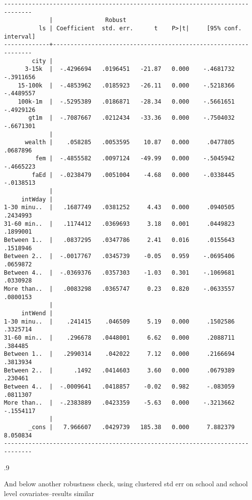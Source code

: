 \documentclass[11pt, letterpaper]{article}
\begin{document}
\begin{spacing}{1.9}
\begin{spacing}{.5}
\begin{scriptsize}
\begin{verbatim}
------------------------------------------------------------------------------
             |               Robust
          ls | Coefficient  std. err.      t    P>|t|     [95% conf. interval]
-------------+----------------------------------------------------------------
        city |
      3-15k  |  -.4296694   .0196451   -21.87   0.000    -.4681732   -.3911656
    15-100k  |  -.4853962   .0185923   -26.11   0.000    -.5218366   -.4489557
    100k-1m  |  -.5295389   .0186871   -28.34   0.000    -.5661651   -.4929126
       gt1m  |  -.7087667   .0212434   -33.36   0.000    -.7504032   -.6671301
             |
      wealth |    .058285   .0053595    10.87   0.000     .0477805    .0687896
         fem |  -.4855582   .0097124   -49.99   0.000    -.5045942   -.4665223
        faEd |  -.0238479   .0051004    -4.68   0.000    -.0338445   -.0138513
             |
     intWday |
1-30 minu..  |   .1687749   .0381252     4.43   0.000     .0940505    .2434993
31-60 min..  |   .1174412   .0369693     3.18   0.001     .0449823    .1899001
Between 1..  |   .0837295   .0347786     2.41   0.016     .0155643    .1518946
Between 2..  |  -.0017767   .0345739    -0.05   0.959    -.0695406    .0659872
Between 4..  |  -.0369376   .0357303    -1.03   0.301    -.1069681    .0330928
More than..  |   .0083298   .0365747     0.23   0.820    -.0633557    .0800153
             |
     intWend |
1-30 minu..  |    .241415    .046509     5.19   0.000     .1502586    .3325714
31-60 min..  |    .296678   .0448001     6.62   0.000     .2088711     .384485
Between 1..  |   .2990314    .042022     7.12   0.000     .2166694    .3813934
Between 2..  |      .1492   .0414603     3.60   0.000     .0679389     .230461
Between 4..  |  -.0009641   .0418857    -0.02   0.982     -.083059    .0811307
More than..  |  -.2383889   .0423359    -5.63   0.000    -.3213662   -.1554117
             |
       _cons |   7.966607   .0429739   185.38   0.000     7.882379    8.050834
------------------------------------------------------------------------------
\end{verbatim}
\end{scriptsize}
\end{spacing}{.9}



And below another robustness check, using clustered std err on school and school
level covariates--results similar
\begin{spacing}{.5}
\begin{scriptsize}
\begin{verbatim}


\end{verbatim}
\end{scriptsize}
\end{spacing}
\end{spacing}
\end{document}
